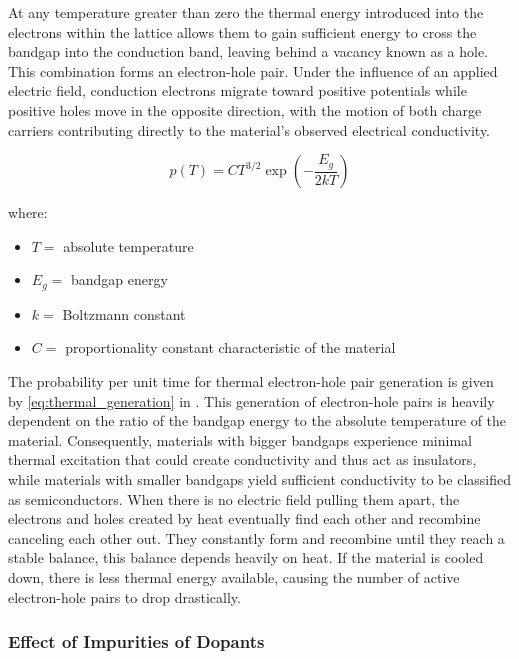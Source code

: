 At any temperature greater than zero the thermal energy introduced into the electrons within the lattice allows them to gain sufficient energy to cross the bandgap into the conduction band, leaving behind a vacancy known as a hole. This combination forms an electron-hole pair. Under the influence of an applied electric field, conduction electrons migrate toward positive potentials while positive holes move in the opposite direction, with the motion of both charge carriers contributing directly to the material's observed electrical conductivity. 

\begin{equation}
    p(T) = C T^{3/2} \exp\left(-\frac{E_g}{2kT}\right)
    \label{eq:thermal_generation}
\end{equation}

where:
\begin{itemize}
    \item $T =$ absolute temperature
    \item $E_g =$ bandgap energy
    \item $k =$ Boltzmann constant
    \item $C =$ proportionality constant characteristic of the material
\end{itemize}

The probability per unit time for thermal electron-hole pair generation is given by \cref{eq:thermal_generation} in \cite[p. 367]{knollRadiationDetectionMeasurement2010}. This generation of electron-hole pairs is heavily dependent on the ratio of the bandgap energy to the absolute temperature of the material. Consequently, materials with bigger bandgaps experience minimal thermal excitation that could create conductivity and thus act as insulators, while materials with smaller bandgaps yield sufficient conductivity to be classified as semiconductors. When there is no electric field pulling them apart, the electrons and holes created by heat eventually find each other and recombine canceling each other out. They constantly form and recombine until they reach a stable balance, this balance depends heavily on heat. If the material is cooled down, there is less thermal energy available, causing the number of active electron-hole pairs to drop drastically.


\subsubsection{Effect of Impurities of Dopants}



